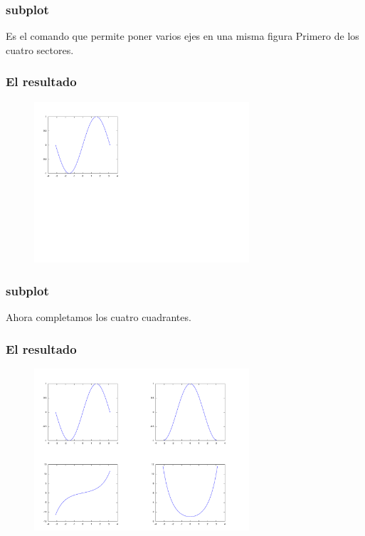 \documentclass[12pt]{beamer}
\begin{document}
\begin{frame}
  \frametitle{subplot}
  Es el comando que permite poner varios ejes en una misma figura
\testcode
Primero de los cuatro sectores.
\end{frame}

\begin{frame}
\frametitle{El resultado}
  \begin{figure}[h]
    \centering{}
    \includegraphics[width=8cm, keepaspectratio]{fig/subplot1.pdf}
  \end{figure}
\end{frame}



\begin{frame}
\frametitle{subplot}
Ahora completamos los cuatro cuadrantes.
\testcode
\end{frame}

\begin{frame}
\frametitle{El resultado}
  \begin{figure}[h]
    \centering{}
    \includegraphics[width=8cm, keepaspectratio]{fig/subplot2.pdf}
  \end{figure}
\end{frame}
\end{document}

